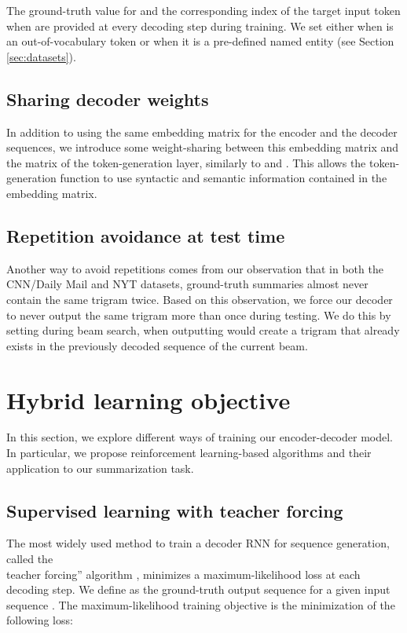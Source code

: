 \documentclass{article} \usepackage{iclr2018_arxiv,times}
\begin{document}
The ground-truth value for  and the corresponding  index of the target input token when  are provided at every decoding step during training. We set  either when  is an out-of-vocabulary token or when it is a pre-defined named entity (see Section \ref{sec:datasets}).

\subsection{Sharing decoder weights}
In addition to using the same embedding matrix  for the encoder and the decoder sequences, we introduce some weight-sharing between this embedding matrix and the  matrix of the token-generation layer, similarly to \citet{inan2016} and \citet{press2016}. This allows the token-generation function to use syntactic and semantic information contained in the embedding matrix.




\subsection{Repetition avoidance at test time}

Another way to avoid repetitions comes from our observation that in both the CNN/Daily Mail and NYT datasets, ground-truth summaries almost never contain the same trigram twice. Based on this observation, we force our decoder to never output the same trigram more than once during testing. We do this by setting  during beam search, when outputting  would create a trigram that already exists in the previously decoded sequence of the current beam.


\section{Hybrid learning objective}
\label{sec:learning-objective}
In this section, we explore different ways of training our encoder-decoder model. In particular, we propose reinforcement learning-based algorithms and their application to our summarization task.
 
\subsection{Supervised learning with teacher forcing}

The most widely used method to train a decoder RNN for sequence generation, called the\\teacher forcing'' algorithm \citep{williams1989}, minimizes a maximum-likelihood loss at each decoding step. We define  as the ground-truth output sequence for a given input sequence . The maximum-likelihood training objective is the minimization of the following loss:
\end{document}
